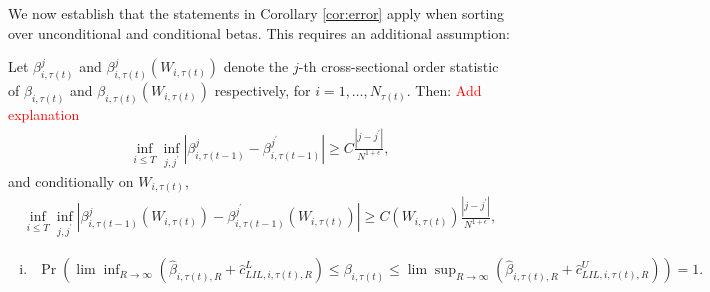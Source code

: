 We now establish that the statements in Corollary \ref{cor:error} apply when sorting over unconditional and conditional betas. This requires an additional assumption:
\begin{assumption}
\label{ass:b5}
Let $\beta^{j}_{i,\tau(t)}$ and $\beta^{j}_{i,\tau(t)} (W_{i,\tau(t)})$ denote the $j$-th cross-sectional order statistic of $\beta_{i,\tau(t)}$ and $\beta_{i,\tau(t)} (W_{i,\tau(t)})$ respectively, for $i = 1, \dots, N_{\tau(t)}$. Then: \textcolor{red}{Add explanation}
\begin{align}
\inf_{i \leq T} \inf_{j,j^\prime} \left|\beta^{j}_{i,\tau(t-1)} - \beta^{j^\prime}_{i,\tau(t-1)}\right| \geq C \frac{\left|j - j^\prime\right|}{N^{1+\epsilon}},
\end{align}
and conditionally on $W_{i,\tau(t)}$,
\begin{align}
\inf_{i \leq T} \inf_{j,j^\prime} \left|\beta^{j}_{i,\tau(t-1)} (W_{i,\tau(t)}) - \beta^{j^\prime}_{i,\tau(t-1)} (W_{i,\tau(t)}) \right| \geq C (W_{i,\tau(t)}) \frac{\left|j - j^\prime\right|}{N^{1+\epsilon}},
\end{align}
\end{assumption}

\begin{enumerate}[(i)]
    \item 
    $\begin{aligned}
        \Pr \left( \lim \inf_{R \rightarrow \infty} \left( \widehat{\beta}_{i,\tau(t),R} + \widehat{c}^L_{LIL,i,\tau(t),R} \right) \leq \beta_{i,\tau(t)} \leq \lim \sup_{R \rightarrow \infty} \left( \widehat{\beta}_{i,\tau(t),R} + \widehat{c}^U_{LIL,i,\tau(t),R} \right) \right) = 1.
    \end{aligned}$ 
\end{enumerate}


